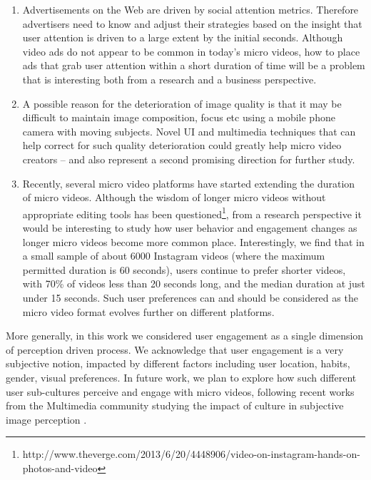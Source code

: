 \begin{enumerate}
    \item Advertisements on the Web are driven by social attention metrics. Therefore advertisers need to know and adjust their strategies based on the insight that user attention is driven to a large extent by the initial seconds. Although  video ads do not appear to be common in today's micro videos, how to place ads that grab user attention within a short duration of time will be a problem that is interesting both from a research and a business perspective. 
    \item A possible reason for the deterioration of image quality is that it may be difficult to maintain image composition, focus etc using a mobile phone camera with moving subjects. Novel UI and multimedia techniques that can help correct for such quality deterioration could greatly help micro video creators -- and also represent a second promising direction for further study. 
    \item Recently, several micro video platforms have started extending the duration of micro videos. Although the wisdom of longer micro videos without appropriate editing tools has been questioned\footnote{\scriptsize http://www.theverge.com/2013/6/20/4448906/video-on-instagram-hands-on-photos-and-video}, from a research perspective it would be interesting to study how user behavior and engagement changes as longer micro videos become more common place. Interestingly, we find that in a small sample of about 6000 Instagram videos (where the maximum permitted duration is 60 seconds), users continue to prefer shorter videos, with 70\% of videos less than 20 seconds long, and the median duration at just under 15 seconds. Such user preferences can and should be considered as the micro video format evolves further on different platforms.
\end{enumerate}

More generally, in this work we considered user engagement as a single dimension of perception driven process. We acknowledge that user engagement is a very subjective notion, impacted by different factors including user location, habits, gender, visual preferences. In  future work, we plan to explore how such different user sub-cultures perceive and engage with micro videos, following recent works from the Multimedia community studying the impact of culture in subjective image perception \cite{jou2015visual}.








